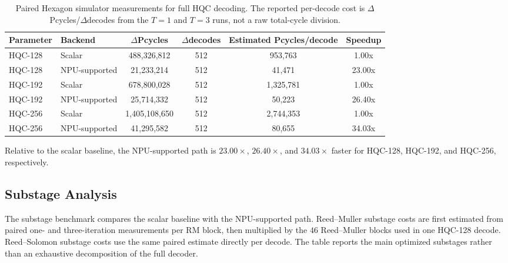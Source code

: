 \begin{table}[htbp]
\centering
\renewcommand{\arraystretch}{1.15}
\small
\begin{tabular}{|l|l|c|c|c|c|}
\hline
\textbf{Parameter} & \textbf{Backend} & \(\Delta\)\textbf{Pcycles} &
\(\Delta\)\textbf{decodes} & \textbf{Estimated Pcycles/decode} &
\textbf{Speedup} \\
\hline
HQC-128 & Scalar & 488,326,812 & 512 & 953,763 & 1.00x \\
\hline
HQC-128 & NPU-supported & 21,233,214 & 512 & 41,471 & 23.00x \\
\hline
HQC-192 & Scalar & 678,800,028 & 512 & 1,325,781 & 1.00x \\
\hline
HQC-192 & NPU-supported & 25,714,332 & 512 & 50,223 & 26.40x \\
\hline
HQC-256 & Scalar & 1,405,108,650 & 512 & 2,744,353 & 1.00x \\
\hline
HQC-256 & NPU-supported & 41,295,582 & 512 & 80,655 & 34.03x \\
\hline
\end{tabular}
\vspace{0.5em}
\caption{Paired Hexagon simulator measurements for full HQC decoding. The
reported per-decode cost is \(\Delta\)Pcycles/\(\Delta\)decodes from the
\(T=1\) and \(T=3\) runs, not a raw total-cycle division.}
\label{tab:sim-pcycles-full}
\end{table}

Relative to the scalar baseline, the NPU-supported path is \(23.00\times\),
\(26.40\times\), and \(34.03\times\) faster for HQC-128, HQC-192, and HQC-256,
respectively.

\subsection{Substage Analysis}

The substage benchmark compares the scalar baseline with the NPU-supported path.
Reed--Muller substage costs are first estimated from paired one- and
three-iteration measurements per RM block, then multiplied by the \(46\)
Reed--Muller blocks used in one HQC-128 decode. Reed--Solomon substage costs
use the same paired estimate directly per decode. The table reports the main
optimized substages rather than an exhaustive decomposition of the full decoder.

